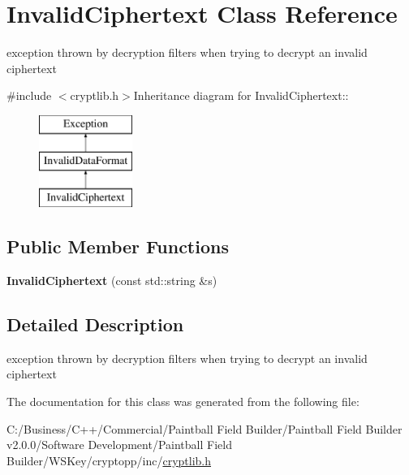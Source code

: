 \hypertarget{class_invalid_ciphertext}{
\section{InvalidCiphertext Class Reference}
\label{class_invalid_ciphertext}
}


exception thrown by decryption filters when trying to decrypt an invalid ciphertext  


{\ttfamily \#include $<$cryptlib.h$>$}Inheritance diagram for InvalidCiphertext::\begin{figure}[H]
\begin{center}
\leavevmode
\includegraphics[height=3cm]{class_invalid_ciphertext}
\end{center}
\end{figure}
\subsection*{Public Member Functions}
\begin{DoxyCompactItemize}
\item 
\hypertarget{class_invalid_ciphertext_a760adc619b8098721bf33d64f5b3eaa7}{
{\bfseries InvalidCiphertext} (const std::string \&s)}
\label{class_invalid_ciphertext_a760adc619b8098721bf33d64f5b3eaa7}

\end{DoxyCompactItemize}


\subsection{Detailed Description}
exception thrown by decryption filters when trying to decrypt an invalid ciphertext 

The documentation for this class was generated from the following file:\begin{DoxyCompactItemize}
\item 
C:/Business/C++/Commercial/Paintball Field Builder/Paintball Field Builder v2.0.0/Software Development/Paintball Field Builder/WSKey/cryptopp/inc/\hyperlink{cryptlib_8h}{cryptlib.h}\end{DoxyCompactItemize}
